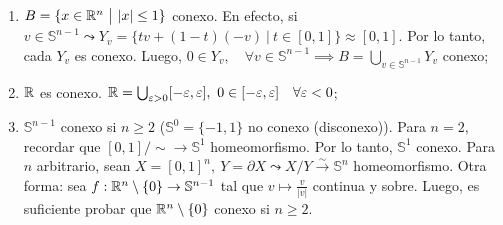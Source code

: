 \begin{eg}~
	\begin{enumerate}
		\item $B = \{x \in \mathbb{R}^n \ \big| \ |x| \leq 1\}$ conexo. En efecto, si $v \in \mathbb{S}^{n-1} \leadsto Y_v = \{tv + (1-t)(-v) \ \big| \ t \in [0,1]\} \approx [0,1]$. Por lo tanto, cada $Y_v$ es conexo. Luego, $0 \in Y_v, \quad \forall v \in \mathbb{S}^{n-1} \implies B = \bigcup_{v \in \mathbb{S}^{n-1}} Y_v$ conexo;

		\item $\mathbb{R}$ es conexo. $\mathbb{R} = \bigcup_{\varepsilon>0} [-\varepsilon,\varepsilon],\ 0 \in [-\varepsilon,\varepsilon]\quad \forall \varepsilon < 0$;

		\item $\mathbb{S}^{n-1}$ conexo si $n\geq 2$ ($\mathbb{S}^{0} = \{-1,1\}$ no conexo (disconexo)). Para $n=2$, recordar que $[0,1] / \sim \to \mathbb{S}^{1}$ homeomorfismo. Por lo tanto, $\mathbb{S}^{1}$ conexo. Para $n$ arbitrario, sean $X = [0,1]^n,\ Y = \partial X \leadsto X / Y \stackrel{\sim}{\longrightarrow} \mathbb{S}^{n}$ homeomorfismo. Otra forma: sea $f: \mathbb{R}^n \setminus \{0\} \to \mathbb{S}^{n-1}$ tal que $v \mapsto \frac{v}{|v|}$ continua y sobre. Luego, es suficiente probar que $\mathbb{R}^n \setminus \{0\}$ conexo si $n \geq 2$.  
	\end{enumerate}
\end{eg}
